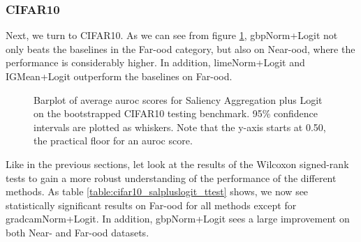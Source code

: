 \documentclass[UKenglish]{uiomasterthesis} %
\theoremstyle{definition}
\begin{document}
%
%
%

\subsubsection{CIFAR10}

Next, we turn to CIFAR10. As we can see from figure \ref{fig:cifar10_salpluslogit_bootstrap_barplot}, \ac{gbp}Norm+Logit not only beats the baselines in the Far-\ac{ood} category, but also on Near-\ac{ood}, where the performance is considerably higher. In addition, \ac{lime}Norm+Logit and IGMean+Logit outperform the baselines on Far-\ac{ood}.

\begin{figure}[H]
    \begin{center}
        
    \end{center}
    \caption[CIFAR10 Saliency Aggregation plus Logit Bootstrap]{Barplot of average \ac{auroc} scores for Saliency Aggregation plus Logit on the bootstrapped CIFAR10 testing benchmark. 95\% confidence intervals are plotted as whiskers. Note that the y-axis starts at 0.50, the practical floor for an \ac{auroc} score.}
    \label{fig:cifar10_salpluslogit_bootstrap_barplot}
\end{figure}

Like in the previous sections, let look at the results of the Wilcoxon signed-rank tests to gain a more robust understanding of the performance of the different methods. As table \ref{table:cifar10_salpluslogit_ttest} shows, we now see statistically significant results on Far-\ac{ood} for all methods except for \ac{gradcam}Norm+Logit. In addition, \ac{gbp}Norm+Logit sees a large improvement on both Near- and Far-\ac{ood} datasets. 
\end{document}
